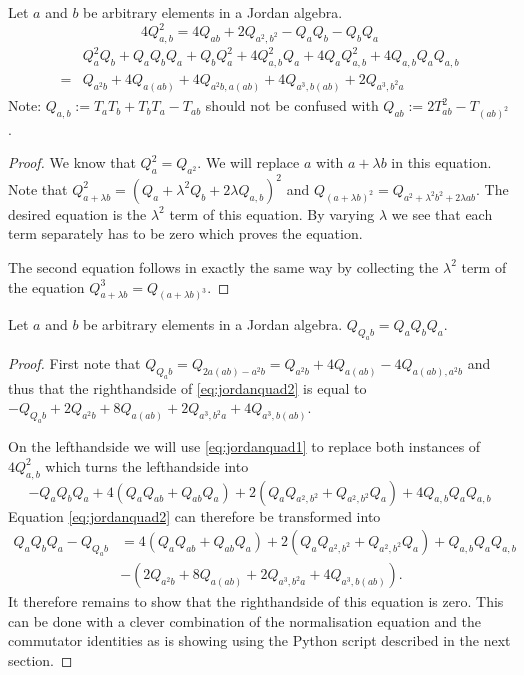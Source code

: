 \documentclass{article}
\begin{document}
\begin{lemma}\label{lem:quad}
	Let $a$ and $b$ be arbitrary elements in a Jordan algebra.
	\begin{equation}\label{eq:jordanquad1}
		 4Q_{a,b}^2 = 4Q_{ab} + 2Q_{a^2,b^2} -Q_aQ_b - Q_bQ_a
	\end{equation}
	\begin{equation}\label{eq:jordanquad2}
    \begin{aligned}
        &Q_a^2Q_b + Q_aQ_bQ_a + Q_bQ_a^2 + 4Q_{a,b}^2Q_a +4Q_aQ_{a,b}^2 + 4Q_{a,b}Q_aQ_{a,b} \\
         =& Q_{a^2b} + 4Q_{a(ab)} + 4Q_{a^2b,a(ab)} + 4 Q_{a^3,b(ab)} + 2Q_{a^3,b^2a}
    \end{aligned}
	\end{equation}
	Note: $Q_{a,b}:= T_aT_b+T_bT_a - T_{ab}$ should not be confused with $Q_{ab}:= 2T_{ab}^2 - T_{(ab)^2}$.
\end{lemma}
\begin{proof}
	We know that $Q_a^2 = Q_{a^2}$. We will replace $a$ with $a+\lambda b$ in this equation. Note that $Q_{a+\lambda b}^2 = (Q_a + \lambda^2 Q_b + 2\lambda Q_{a,b})^2$ and $Q_{(a+\lambda b)^2} = Q_{a^2 + \lambda^2 b^2 + 2\lambda ab}$. The desired equation is the $\lambda^2$ term of this equation. By varying $\lambda$ we see that each term separately has to be zero which proves the equation.

	The second equation follows in exactly the same way by collecting the $\lambda^2$ term of the equation $Q_{a+\lambda b}^3 = Q_{(a+\lambda b)^3}$.
\end{proof}

\begin{theorem}\label{theor:fund}
	Let $a$ and $b$ be arbitrary elements in a Jordan algebra. $Q_{Q_a b} = Q_aQ_bQ_a$.
\end{theorem}
\begin{proof}
	First note that $Q_{Q_a b} = Q_{2a(ab) - a^2b} = Q_{a^2b} + 4Q_{a(ab)} -4Q_{a(ab),a^2b}$ and thus that the righthandside of \eqref{eq:jordanquad2} is equal to $-Q_{Q_a b} + 2Q_{a^2b} + 8 Q_{a(ab)} + 2Q_{a^3,b^2a} + 4Q_{a^3,b(ab)}$.

	On the lefthandside we will use \eqref{eq:jordanquad1} to replace both instances of $4Q_{a,b}^2$ which turns the lefthandside into
	$$-Q_aQ_bQ_a + 4(Q_aQ_{ab}+Q_{ab}Q_a) + 2(Q_aQ_{a^2,b^2} + Q_{a^2,b^2}Q_a) + 4 Q_{a,b}Q_aQ_{a,b}$$
	Equation \eqref{eq:jordanquad2} can therefore be transformed into
	\begin{align*}
		Q_aQ_bQ_a - Q_{Q_a b}  &= 4(Q_aQ_{ab}+Q_{ab}Q_a) + 2(Q_aQ_{a^2,b^2} + Q_{a^2,b^2}Q_a) + Q_{a,b}Q_aQ_{a,b} \\
		&-( 2Q_{a^2b} + 8 Q_{a(ab)} + 2Q_{a^3,b^2a} + 4Q_{a^3,b(ab)}).
	\end{align*}
	It therefore remains to show that the righthandside of this equation is zero. This can be done with a clever combination of the normalisation equation and the commutator identities as is showing using the Python script described in the next section.
\end{proof}
	
\end{document}
